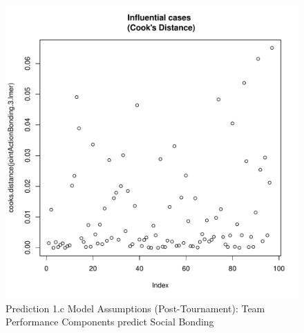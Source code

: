 \begin{CJK}{UTF8}{gbsn}
\begin{figure}[!htbp]
              \includegraphics[scale =.4]{images/MLM3aCooksD.pdf}
              \caption{Prediction 1.c Model Assumptions (Post-Tournament): Team Performance Components predict Social Bonding}
              \label{fig:MLM3aAssumptions}
            \end{figure}



\end{CJK}
